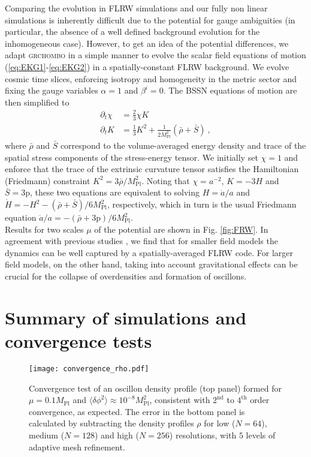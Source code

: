 \documentclass[
    reprint,
    preprintnumbers,
    superscriptaddress,
    nofootinbib,
     amsmath,amssymb,
     aps,
     prd,
    floatfix,
    ]{revtex4-2}
\newcommand{\mpl}{M_\mathrm{Pl}}
\begin{document}
Comparing the evolution in FLRW simulations and our fully non linear simulations is inherently difficult due to the potential for gauge ambiguities (in particular, the absence of a well defined background evolution for the inhomogeneous case). However, to get an idea of the potential differences, we adapt \textsc{grchombo} in a simple manner to evolve the scalar field equations of motion (\ref{eq:EKG1}-\ref{eq:EKG2}) in a spatially-constant FLRW background. We evolve cosmic time slices, enforcing isotropy and homogeneity in the metric sector and fixing the gauge variables $\alpha=1$ and $\beta^i=0$. The BSSN equations of motion are then simplified to
\begin{align}
    \partial_t\chi &= \frac{2}{3}\chi K \\
    \partial_t K &= \frac{1}{3} K^2 + \frac{1}{2\mpl^2} (\bar{\rho} + \bar{S})~,
\end{align}
where $\bar{\rho}$ and $\bar{S}$ correspond to the volume-averaged energy density and trace of the spatial stress components of the stress-energy tensor.  We initially set $\chi = 1$ and enforce that the trace of the extrinsic curvature tensor satisfies the Hamiltonian (Friedmann) constraint $K^2=3\bar{\rho}/\mpl^2$. Noting that $\chi=a^{-2}$, $K=-3H$ and $\bar{S}=3\mathrm{p}$, these two equations are equivalent to solving $H=\dot{a}/a$ and $\dot{H}=-H^2-(\bar{\rho} + \bar{S})/6\mpl^2$, respectively, which in turn is the usual Friedmann equation $\ddot{a}/a=-(\bar{\rho} + 3\mathrm{p})/6\mpl^2$.\\


Results for two scales $\mu$ of the potential are shown in Fig. \ref{fig:FRW}. In agreement with previous studies \cite{Kou:2019bbc}, we find that for smaller field models the dynamics can be well captured by a spatially-averaged FLRW code. For larger field models, on the other hand, taking into account gravitational effects can be crucial for the collapse of overdensities and formation of oscillons.

\vspace{20pt}
\section{Summary of simulations and convergence tests}
\label{app:testing}



\begin{figure}[b]
    \centering
\texttt{[image: convergence\_rho.pdf]}
\caption{Convergence test of an oscillon density profile  (top panel) formed for $\mu=0.1\mpl$ and $\langle\delta\phi^2\rangle\approx 10^{-8}\mpl^2$, consistent with $2^\mathrm{nd}$ to $4^\mathrm{th}$ order convergence, as expected. The error in the bottom panel is calculated by subtracting the density profiles $\rho$ for low ($N=64$), medium ($N=128$) and high ($N=256$) resolutions, with $5$ levels of adaptive mesh refinement.}
\label{fig:convergence_rho}
\end{figure}
\end{document}
